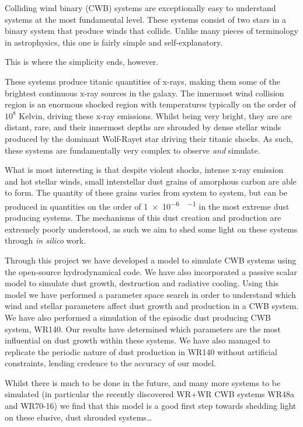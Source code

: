 


\begin{abstracts}        %

\setlength{\parindent}{17.62482pt}
\setlength{\parskip}{0.0pt plus 1.0pt}

Colliding wind binary (CWB) systems are exceptionally easy to understand systems at the most fundamental level.
These systems consist of two stars in a binary system that produce winds that collide.
Unlike many pieces of terminology in astrophysics, this one is fairly simple and self-explanatory.

\begin{center}
  This is where the simplicity ends, however.
\end{center}

These systems produce titanic quantities of x-rays, making them some of the brightest continuous x-ray sources in the galaxy.
The innermost wind collision region is an enormous shocked region with temperatures typically on the order of $10^8$ Kelvin, driving these x-ray emissions.
Whilst being very bright, they are are distant, rare, and their innermost depths are shrouded by dense stellar winds produced by the dominant Wolf-Rayet star driving their titanic shocks.
As such, these systems are fundamentally very complex to observe \emph{and} simulate.

What is most interesting is that despite violent shocks, intense x-ray emission and hot stellar winds, small interstellar dust grains of amorphous carbon are able to form.
The quantity of these grains varies from system to system, but can be produced in quantities on the order of \SI{1e-6}{\solarmass\per\year} in the most extreme dust producing systems.
The mechanisms of this dust creation and production are extremely poorly understood, as such we aim to shed some light on these systems through \emph{in silico} work.

Through this project we have developed a model to simulate CWB systems using the open-source \athena{} hydrodynamical code.
We have also incorporated a passive scalar model to simulate dust growth, destruction and radiative cooling.
Using this model we have performed a parameter space search in order to understand which wind and stellar parameters affect dust growth and production in a CWB system.
We have also performed a simulation of the episodic dust producing CWB system, WR140.
Our results have determined which parameters are the most influential on dust growth within these systems.
We have also managed to replicate the periodic nature of dust production in WR140 without artificial constraints, lending credence to the accuracy of our model.

Whilst there is much to be done in the future, and many more systems to be simulated (in particular the recently discovered WR+WR CWB systems WR48a and WR70-16) we find that this model is a good first step towards shedding light on these elusive, dust shrouded systems\ldots
	
\end{abstracts}


